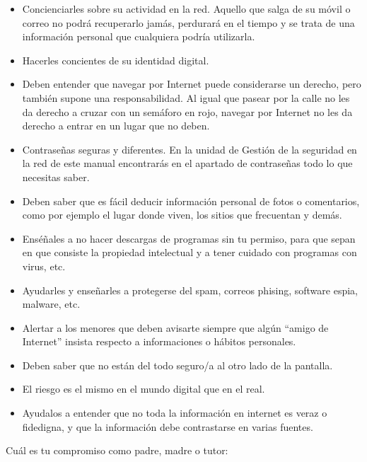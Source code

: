 \documentclass[
  spanish,
  a4paper,
  openany]{book}
\begin{document}
\begin{itemize}
\item
  Concienciarles sobre su actividad en la red. Aquello que salga de su móvil o correo no podrá recuperarlo jamás, perdurará en el tiempo y se trata de una información personal que cualquiera podría utilizarla.
\item
  Hacerles concientes de su identidad digital.
\item
  Deben entender que navegar por Internet puede considerarse un derecho, pero también supone una responsabilidad. Al igual que pasear por la calle no les da derecho a cruzar con un semáforo en rojo, navegar por Internet no les da derecho a entrar en un lugar que no deben.
\item
  Contraseñas seguras y diferentes. En la unidad de Gestión de la seguridad en la red de este manual encontrarás en el apartado de contraseñas todo lo que necesitas saber.
\item
  Deben saber que es fácil deducir información personal de fotos o comentarios, como por ejemplo el lugar donde viven, los sitios que frecuentan y demás.
\item
  Enséñales a no hacer descargas de programas sin tu permiso, para que sepan en que consiste la propiedad intelectual y a tener cuidado con programas con virus, etc.
\item
  Ayudarles y enseñarles a protegerse del spam, correos phising, software espia, malware, etc.
\item
  Alertar a los menores que deben avisarte siempre que algún ``amigo de Internet'' insista respecto a informaciones o hábitos personales.
\item
  Deben saber que no están del todo seguro/a al otro lado de la pantalla.
\item
  El riesgo es el mismo en el mundo digital que en el real.
\item
  Ayudalos a entender que no toda la información en internet es veraz o fidedigna, y que la información debe contrastarse en varias fuentes.
\end{itemize}

Cuál es tu compromiso como padre, madre o tutor:
\end{document}
